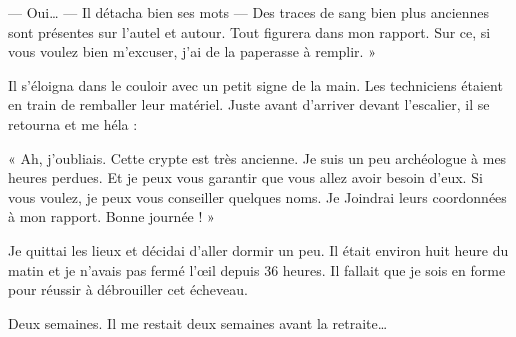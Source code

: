 — Oui… — Il détacha bien ses mots — Des traces de sang bien plus anciennes sont présentes sur l'autel et autour. Tout 
figurera dans mon rapport. Sur ce, si vous voulez bien m'excuser, j'ai de la paperasse à remplir. »

Il s'éloigna dans le couloir avec un petit signe de la main. Les techniciens étaient en train de remballer leur 
matériel. Juste avant d'arriver devant l'escalier, il se retourna et me héla :

« Ah, j'oubliais. Cette crypte est très ancienne. Je suis un peu archéologue à mes heures perdues. Et je peux vous 
garantir que vous allez avoir besoin d'eux. Si vous voulez, je peux vous conseiller quelques noms. Je Joindrai leurs 
coordonnées à mon rapport. Bonne journée ! »

Je quittai les lieux et décidai d'aller dormir un peu. Il était environ huit heure du matin et je n'avais pas fermé 
l'œil depuis 36 heures. Il fallait que je sois en forme pour réussir à débrouiller cet écheveau.

Deux semaines. Il me restait deux semaines avant la retraite…